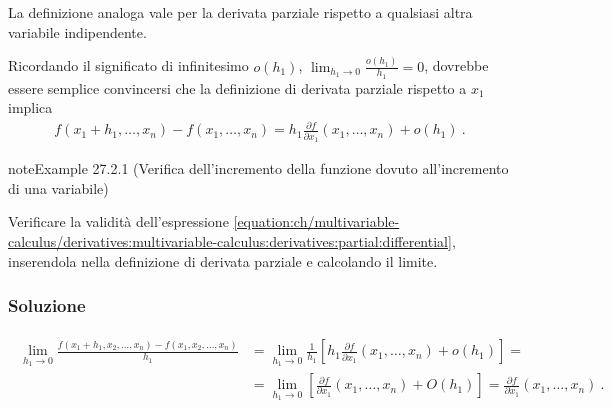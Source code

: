 \documentclass[letterpaper,10pt,italian]{jupyterBook}
\begin{document}
\sphinxAtStartPar
La definizione analoga vale per la derivata parziale rispetto a qualsiasi altra variabile indipendente.

\sphinxAtStartPar
Ricordando il significato di infinitesimo \(o(h_1)\), \(\lim_{h_1 \rightarrow 0} \frac{o(h_1)}{h_1} = 0\), dovrebbe essere semplice convincersi che la definizione di derivata parziale rispetto a \(x_1\) implica
\begin{equation}\label{equation:ch/multivariable-calculus/derivatives:multivariable-calculus:derivatives:partial:differential}
\begin{split}
  f(x_1+h_1, \dots, x_n) - f(x_1, \dots, x_n) = h_1 \frac{\partial f}{\partial x_1}(x_1, \dots, x_n) + o(h_1) \ .
\end{split}
\end{equation}\label{ch/multivariable-calculus/derivatives:multivariable-calculus:increment-1}
\begin{sphinxadmonition}{note}{Example 27.2.1 (Verifica dell’incremento della funzione dovuto all’incremento di una variabile)}



\sphinxAtStartPar
Verificare la validità dell’espressione \eqref{equation:ch/multivariable-calculus/derivatives:multivariable-calculus:derivatives:partial:differential}, inserendola nella definizione di derivata parziale e calcolando il limite.
\subsubsection*{Soluzione}
\begin{equation*}
\begin{split}\begin{aligned}
  \lim_{h_1 \rightarrow 0} \frac{f(x_1+h_1, x_2, \dots, x_n) - f(x_1, x_2, \dots, x_n)}{h_1} & = 
  \lim_{h_1 \rightarrow 0} \frac{1}{h_1} \left[ h_1 \frac{\partial f}{\partial x_1}(x_1, \dots, x_n) + o(h_1) \right] = \\
  & = \lim_{h_1 \rightarrow 0} \left[ \frac{\partial f}{\partial x_1}(x_1, \dots, x_n) + O(h_1) \right] = \frac{\partial f}{\partial x_1}(x_1, \dots, x_n) \ .
\end{aligned}\end{split}
\end{equation*}\end{sphinxadmonition}
\end{document}
